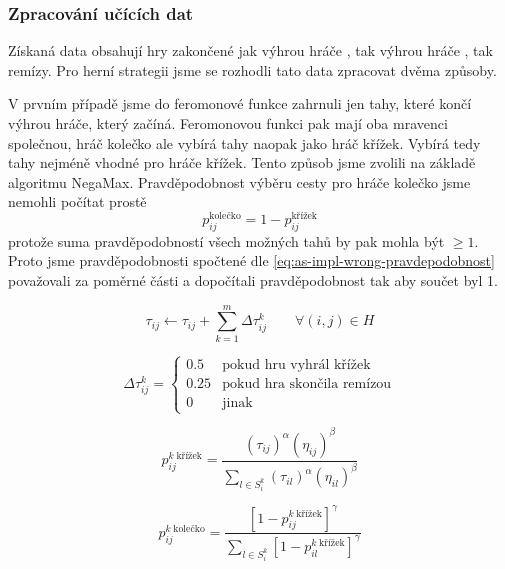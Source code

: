 \documentclass[12pt]{article}
\begin{document}
\subsubsection{Zpracování učících dat}
Získaná data obsahují hry zakončené jak výhrou hráče , tak výhrou hráče , tak remízy. Pro herní strategii jsme se rozhodli tato data zpracovat dvěma způsoby.

V prvním případě jsme do feromonové funkce zahrnuli jen tahy, které končí výhrou hráče, který začíná. Feromonovou funkci pak mají oba mravenci společnou, hráč kolečko ale vybírá tahy naopak jako hráč křížek. Vybírá tedy tahy nejméně vhodné pro hráče křížek. Tento způsob jsme zvolili na základě algoritmu NegaMax. Pravděpodobnost výběru cesty pro hráče kolečko jsme nemohli počítat prostě 
\begin{equation}\label{eq:as-impl-wrong-pravdepodobnost}
p_{ij}^\text{kolečko} = 1 -  p_{ij}^\text{křížek}
\end{equation}
protože suma pravděpodobností všech možných tahů by pak mohla být $\ge 1$. Proto jsme pravděpodobnosti spočtené dle \eqref{eq:as-impl-wrong-pravdepodobnost} považovali za poměrné části a dopočítali pravděpodobnost tak aby součet byl 1.

\begin{equation}
	\tau_{ij} \leftarrow \tau_{ij} + \sum_{k=1}^m \Delta \tau_{ij}^ {k} \qquad \forall(i,j) \in H
\end{equation}

\begin{equation}
	\Delta \tau_{ij}^{k} = \begin{cases} 
		0.5 	&\text{pokud hru vyhrál křížek}
	\\
		0.25 	&\text{pokud hra skončila remízou}
	\\
		0	 	&\text{jinak}
	\end{cases}
\end{equation}

\begin{equation} \label{eq:as-impl-pravdepodobnost-krizek}
	p_{ij}^{k \; \text{křížek}} =
		 \frac{(\tau_{ij})^\alpha(\eta_{ij})^\beta}
		 {\sum_{l \in S_{i}^{k}}(\tau_{il})^\alpha (\eta_{il})^\beta}
\end{equation}

\begin{equation} \label{eq:as-impl-pravdepodobnost-kolecko}
	p_{ij}^{k \; \text{kolečko}} = 
		\frac{ \left[1-p_{ij}^{k \; \text{křížek}} \right]^\gamma }
		{\sum_{l \in S_{i}^{k}} \left[1 - p_{il}^{k \; \text{křížek}} \right]^\gamma }
\end{equation}
\end{document}
